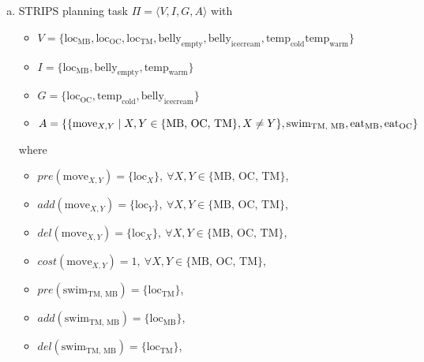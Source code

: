 \documentclass{article} %
\begin{document}
\section{}
\begin{enumerate}[(a)]
    \item STRIPS planning task $\Pi = \langle
        V, I, G, A
    \rangle$ with
    \begin{itemize}
        \item $V = \{
        \text{loc}_{\text{MB}},
        \text{loc}_{\text{OC}},
        \text{loc}_{\text{TM}},
        \text{belly}_{\text{empty}},
        \text{belly}_{\text{icecream}},
        \text{temp}_{\text{cold}}
        \text{temp}_{\text{warm}}
        \}$
        \item $I = \{
        \text{loc}_{\text{MB}},
        \text{belly}_{\text{empty}},
        \text{temp}_{\text{warm}}
        \}$
        \item $G = \{
            \text{loc}_{\text{OC}},
            \text{temp}_{\text{cold}},
            \text{belly}_\text{icecream}
        \}$
        \item $A =
        \{ 
           \{ \text{move}_{X,Y} \mid X, Y \in \{ \text{MB, OC, TM} \}, X \neq Y \},\\
           \text{swim}_\text{TM, MB},\\
           \text{eat}_\text{MB},\\
           \text{eat}_\text{OC}
        \}
        $
    \end{itemize}
    where
    \begin{itemize}
        \item $pre(\text{move}_{X,Y}) = \{ \text{loc}_X \},
        \ \forall X, Y \in \{ \text{MB, OC, TM} \}$,
        \item $add(\text{move}_{X,Y}) = \{ \text{loc}_Y \},
        \ \forall X, Y \in \{ \text{MB, OC, TM} \}$,
        \item $del(\text{move}_{X,Y}) = \{ \text{loc}_X \},
        \ \forall X, Y \in \{ \text{MB, OC, TM} \}$,
        \item $cost(\text{move}_{X,Y}) = 1,
        \ \forall X, Y \in \{ \text{MB, OC, TM} \}$,
        \item $pre(\text{swim}_\text{TM, MB}) =
        \{ \text{loc}_\text{TM} \}$,
        \item $add(\text{swim}_\text{TM, MB}) =
        \{ \text{loc}_\text{MB} \}$,
        \item $del(\text{swim}_\text{TM, MB}) =
        \{ \text{loc}_\text{TM} \}$,

\end{itemize}
\end{enumerate}
\end{document}
